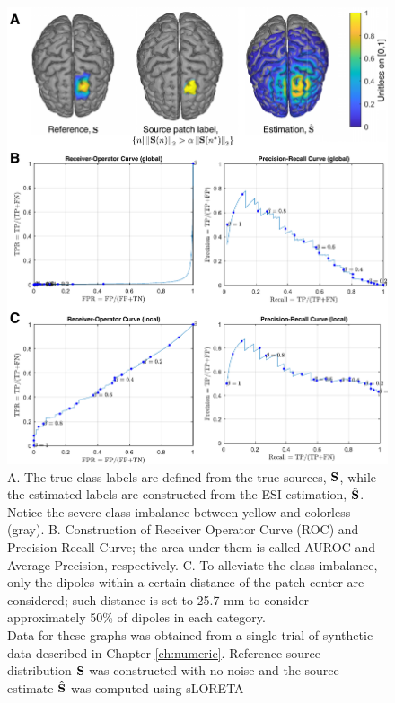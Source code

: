 \begin{figure}
\centering
\includegraphics[scale=0.85]{./img/AUROC_sketch.pdf}
%
\caption{
A. The true class labels are defined from the true sources, $\mathbf{S}$, while the estimated labels are constructed from the ESI estimation, $\hat{\mathbf{S}}$.
Notice the severe class imbalance between yellow and colorless (gray).
%
B. Construction of Receiver Operator Curve (ROC) and Precision-Recall Curve; the area under them is called AUROC and Average Precision, respectively.
%
C. To alleviate the class imbalance, only the dipoles within a certain distance of the patch center are considered; such distance is set to 25.7 \si{mm} to consider approximately 50\% of dipoles in each category.
\\
%
Data for these graphs was obtained from a single trial of synthetic data described in Chapter \ref{ch:numeric}. Reference source distribution $\mathbf{S}$ was constructed with no-noise and the source estimate $\hat{\mathbf{S}}$ was computed using sLORETA
}
\label{fig:AUROC}
\end{figure}


